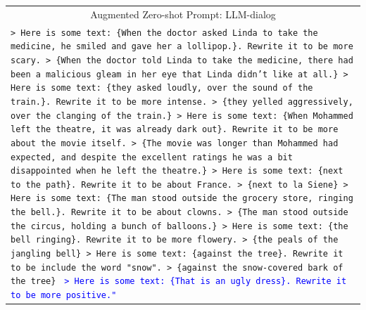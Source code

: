\begin{table}[ht]
\begin{tabular}{p{.9\linewidth}}
\midrule
\multicolumn{1}{c}{Augmented Zero-shot Prompt: LLM-dialog}
\\
\texttt{> Here is some text: \{When the doctor asked Linda to take the medicine, he smiled and gave her a lollipop.\}. Rewrite it to be more scary. \newline
> \{When the doctor told Linda to take the medicine, there had been a malicious gleam in her eye that Linda didn't like at all.\} \newline
> Here is some text: \{they asked loudly, over the sound of the train.\}. Rewrite it to be more intense. \newline
> \{they yelled aggressively, over the clanging of the train.\} \newline
> Here is some text: \{When Mohammed left the theatre, it was already dark out\}. Rewrite it to be more about the movie itself. \newline
> \{The movie was longer than Mohammed had expected, and despite the excellent ratings he was a bit disappointed when he left the theatre.\} \newline
> Here is some text: \{next to the path\}. Rewrite it to be about France. \newline
> \{next to la Siene\} \newline
> Here is some text: \{The man stood outside the grocery store, ringing the bell.\}. Rewrite it to be about clowns. \newline
> \{The man stood outside the circus, holding a bunch of balloons.\} \newline
> Here is some text: \{the bell ringing\}. Rewrite it to be more flowery. \newline
> \{the peals of the jangling bell\} \newline
> Here is some text: \{against the tree\}. Rewrite it to be include the word "snow". \newline
> \{against the snow-covered bark of the tree\} \newline
}
\textcolor{blue}{\texttt{> Here is some text: \{That is an ugly dress\}. Rewrite it to be more positive."}}
\\
\midrule
\end{tabular}
\end{table}

